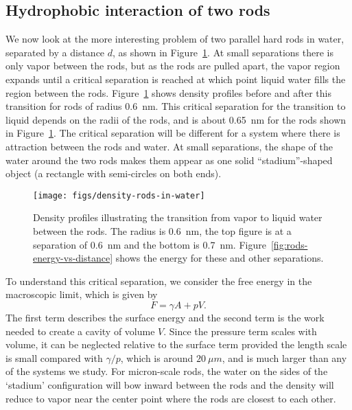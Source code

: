 \documentclass[twocolumn,amsmath,amssymb,prb]{revtex4-1}
\begin{document}
\subsection{Hydrophobic interaction of two rods}

We now look at the more interesting problem of two parallel hard rods
in water, separated by a distance $d$, as shown in
Figure~\ref{fig:density-rods}.  At small separations there is only vapor
between the rods, but as the rods are pulled apart, the vapor region
expands until a critical separation is reached at which point liquid
water fills the region between the rods.
Figure~\ref{fig:density-rods} shows density profiles before and after
this transition for rods of radius 0.6~nm. This critical separation
for the transition to liquid depends on the radii of the rods, and is
about 0.65~nm for the rods shown in Figure~\ref{fig:density-rods}.
The critical separation will be different for a system where there is
attraction between the
rods and water.  At small separations, the shape of the water around the two
rods makes them appear as one solid ``stadium''-shaped object
(a rectangle with semi-circles on both ends).


\begin{figure}
\begin{center}
\texttt{[image: figs/density-rods-in-water]}
\end{center}
\caption{ Density profiles illustrating the transition from vapor 
to liquid water between the rods. The radius is 0.6~nm, the top figure is
at a separation of 0.6~nm and the
bottom is 0.7~nm. Figure~\ref{fig:rods-energy-vs-distance} shows
the energy for these and other separations.}
\label{fig:density-rods}
\end{figure}

To understand this critical separation, we consider the free energy in
the macroscopic limit, which is given by
\begin{equation}
F = \gamma A + pV.
\end{equation}
The first term describes the surface energy and the second term is the
work needed to create a cavity of volume $V$. Since the pressure term
scales with volume, it can be neglected relative to the surface term
provided the length scale is small compared with $\gamma / p$, which
is around $20~\mu m$, and is much larger than any of the systems we
study. For micron-scale rods, the water on the sides of the `stadium'
configuration will bow inward between the rods and the density will
reduce to vapor near the center point where the rods are closest to
each other.
\end{document}
